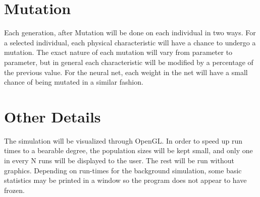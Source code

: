 \section{Mutation}

Each generation, after Mutation will be done on each individual in two ways. For a selected individual, each physical characteristic will have a chance to undergo a mutation. The exact nature of each mutation will vary from parameter to parameter, but in general each characteristic will be modified by a percentage of the previous value. For the neural net, each weight in the net will have a small chance of being mutated in a similar fashion.

\section{Other Details}

The simulation will be visualized through OpenGL. In order to speed up run times to a bearable degree, the population sizes will be kept small, and only one in every N runs will be displayed to the user. The rest will be run without graphics. Depending on run-times for the background simulation, some basic statistics may be printed in a window so the program does not appear to have frozen.